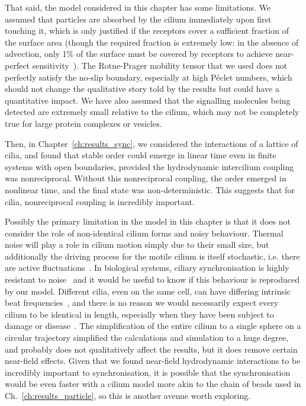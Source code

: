 That said, the model considered in this chapter has some limitations. We assumed that particles are absorbed by the cilium immediately upon first touching it, which is only justified if the receptors cover a sufficient fraction of the surface area (though the required fraction is extremely low: in the absence of advection, only 1\% of the surface must be covered by receptors to achieve near-perfect sensitivity~). The Rotne-Prager mobility tensor that we used does not perfectly satisfy the no-slip boundary, especially at high Péclet numbers, which should not change the qualitative story told by the results but could have a quantitative impact. We have also assumed that the signalling molecules being detected are extremely small relative to the cilium, which may not be completely true for large protein complexes or vesicles.

Then, in Chapter~\ref{ch:results_sync}, we considered the interactions of a lattice of cilia, and found that stable order could emerge in linear time even in finite systems with open boundaries, provided the hydrodynamic intercilium coupling was nonreciprocal. Without this nonreciprocal coupling, the order emerged in nonlinear time, and the final state was non-deterministic. This suggests that for cilia, nonreciprocal coupling is incredibly important.

Possibly the primary limitation in the model in this chapter is that it does not consider the role of non-identical cilium forms and noisy behaviour. Thermal noise will play a role in cilium motion simply due to their small size, but additionally the driving process for the motile cilium is itself stochastic, i.e. there are active fluctuations~. In biological systems, ciliary synchronisation is highly resistant to noise~ and it would be useful to know if this behaviour is reproduced by our model. Different cilia, even on the same cell, can have differing intrinsic beat frequencies~, and there is no reason we would necessarily expect every cilium to be identical in length, especially when they have been subject to damage or disease~. The simplification of the entire cilium to a single sphere on a circular trajectory simplified the calculations and simulation to a huge degree, and probably does not qualitatively affect the results, but it does remove certain near-field effects. Given that we found near-field hydrodynamic interactions to be incredibly important to synchronisation, it is possible that the synchronisation would be even faster with a cilium model more akin to the chain of beads used in Ch.~\ref{ch:results_particle}, so this is another avenue worth exploring.

